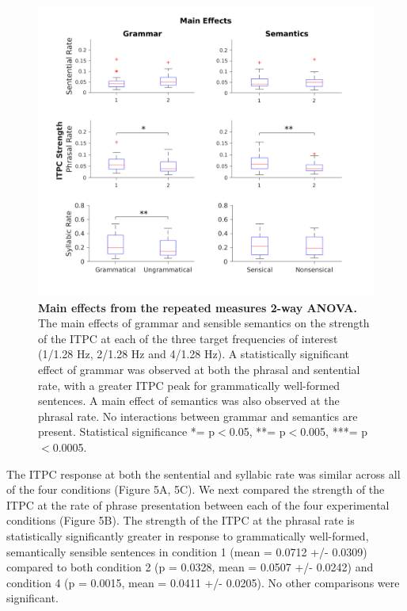 \documentclass[10pt,letterpaper]{article}
\begin{document}
\begin{figure}[tbhp]
\includegraphics[width=\linewidth]{BoxPlots_main_effects.png}
\caption{\textbf{Main effects from the repeated measures 2-way ANOVA.} The main effects of grammar and sensible semantics on the strength of the ITPC at each of the three target frequencies of interest (1/1.28 Hz, 2/1.28 Hz and 4/1.28 Hz). A statistically significant effect of grammar was observed at both the phrasal and sentential rate, with a greater ITPC peak for grammatically well-formed sentences. A main effect of semantics was also observed at the phrasal rate. No interactions between grammar and semantics are present. Statistical significance *= p$<$0.05, **= p$<$0.005, ***= p$<$0.0005.}
\label{MainEffects}
\end{figure}


The ITPC response at both the sentential and syllabic rate was similar across all of the four conditions (Figure 5A, 5C). We next compared the strength of the ITPC at the rate of phrase presentation between each of the four experimental conditions (Figure 5B). The strength of the ITPC at the phrasal rate is statistically significantly greater in response to grammatically well-formed, semantically sensible sentences in  condition 1 (mean = 0.0712 +/- 0.0309) compared to both condition 2 (p = 0.0328, mean = 0.0507 +/- 0.0242) and condition 4 (p = 0.0015, mean = 0.0411 +/- 0.0205). No other comparisons were significant.
\end{document}
